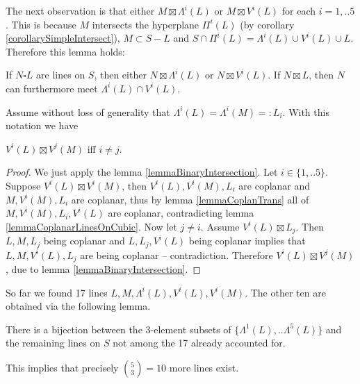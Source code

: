 The next observation is that either $M\boxtimes \Lambda^i(L)$ or $M\boxtimes V^i(L)$ for each $i=1,..5$.
This is because $M$ intersects the hyperplane $\Pi^i(L)$ (by corollary \ref{corollarySimpleIntersect}), $M \subset S - L$ and $S \cap \Pi^i(L) = \Lambda^i(L) \cup V^i(L) \cup L$. Therefore this lemma holds:
\begin{lemma} \label{lemmaBinaryIntersection}
If $N\square L$ are lines on $S$, then either $N \boxtimes \Lambda^i(L)$ or $N \boxtimes V^i(L)$.
If $N\boxtimes L$, then $N$ can furthermore meet $\Lambda^i(L)\cap V^i(L)$.
\end{lemma}

Assume without loss of generality that $\Lambda^i(L) = \Lambda^i(M) =: L_i$. With this notation we have
\begin{lemma}
$V^i(L) \boxtimes V^j(M)$ iff $i \neq j$.
\end{lemma}
\begin{proof}
We just apply the lemma \ref{lemmaBinaryIntersection}.
Let $i \in\{ 1,..5\}$.
Suppose $V^i(L) \boxtimes V^i(M)$, then $V^i(L),V^i(M),L_i$ are coplanar and $M,V^i(M),L_i$ are coplanar, thus by lemma \ref{lemmaCoplanTrans} all of $M,V^i(M),L_i,V^i(L)$ are coplanar, contradicting lemma \ref{lemmaCoplanarLinesOnCubic}.
Now let $j \neq i$.
Assume $V^i(L) \boxtimes L_j$. Then $L,M,L_j$ being coplanar and $L,L_j,V^i(L)$ being coplanar implies that $L,M,V^i(L),L_j$ are being coplanar -- contradiction.
Therefore $V^i(L) \boxtimes V^j(M)$, due to lemma \ref{lemmaBinaryIntersection}.
\end{proof}

So far we found 17 lines $L,M,\Lambda^i(L),V^i(L),V^i(M)$.
The other ten are obtained via the following lemma.

\begin{lemma}
There is a bijection between the 3-element subsets of $\{\Lambda^1(L),..\Lambda^5(L)\}$ and the remaining lines on $S$ not among the 17 already accounted for.
\end{lemma}

This implies that precisely $\binom{5}{3} = 10$ more lines exist.

